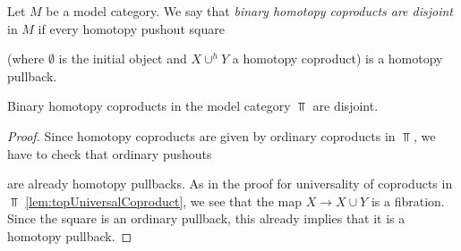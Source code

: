 \begin{definition}
    Let $M$ be a model category.
    We say that \emph{binary homotopy coproducts are disjoint} in $M$ if every homotopy pushout square
    \begin{center}
    \end{center}
    (where $\emptyset$ is the initial object and $X\cup^h Y$ a homotopy coproduct) is a homotopy pullback.
\end{definition}
\begin{lemma}\label{lem:binCoprodDisjoint}
    Binary homotopy coproducts in the model category $\Top$ are disjoint.
    \begin{proof}
        Since homotopy coproducts are given by ordinary coproducts in $\Top$, we have to check that ordinary pushouts
        \begin{center}
        \end{center}
        are already homotopy pullbacks.
        As in the proof for universality of coproducts in $\Top$ \cref{lem:topUniversalCoproduct}, we see that the map $X\to X\cup Y$ is a fibration.
        Since the square is an ordinary pullback, this already implies that it is a homotopy pullback.
    \end{proof}
\end{lemma}
